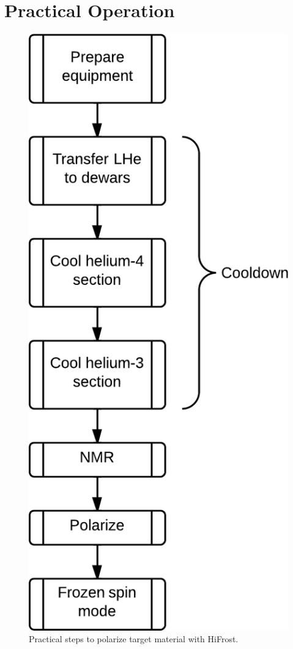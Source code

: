 \chapter{Practical Operation} 
\label{chapter:practical-op}
\begin{figure}[!h]
 \centering
 \includegraphics[scale=.24]{./img/cooldown-overview-flowchart.png}
 \caption{Practical steps to polarize target material with HiFrost.}
 \label{fig:cooldown-overview-flowchart}
\end{figure}

